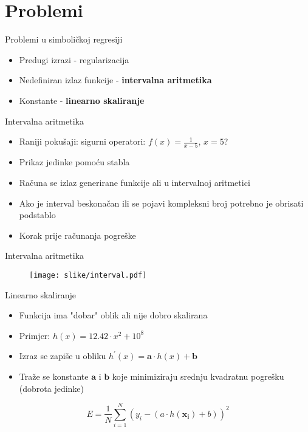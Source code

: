 \documentclass[utf8]{beamer}
\begin{document}
\section{Problemi}
\begin{frame}{Problemi u simboličkoj regresiji}
\begin{itemize}
\item Predugi izrazi - regularizacija
\item Nedefiniran izlaz funkcije - \textbf{intervalna aritmetika}
\item Konstante - \textbf{linearno skaliranje}
\end{itemize}
\end{frame}

\begin{frame}{Intervalna aritmetika}
	\begin{itemize}
		\item Raniji pokušaji: sigurni operatori: $f(x)=\frac{1}{x-5}$, $x=5$?
		\pause
		\item Prikaz jedinke pomoću stabla
		\item Računa se izlaz generirane funkcije ali u intervalnoj aritmetici
		\item Ako je interval beskonačan ili se pojavi kompleksni broj potrebno je obrisati podstablo
		\item Korak prije računanja pogreške
	\end{itemize}
\end{frame}

\begin{frame}{Intervalna aritmetika}
	\begin{figure}
		\centering
		\texttt{[image: slike/interval.pdf]}
	\end{figure}
\end{frame}

\begin{frame}{Linearno skaliranje}
	\begin{itemize}
		\item Funkcija ima "dobar" oblik ali nije dobro skalirana
		\item Primjer: $h(x) = 12.42\cdot x^{2} + 10^{8}$
		\pause
		\item Izraz se zapiše u obliku $h^{'}(x)=\mathbf{a}\cdot h(x) + \mathbf{b}$		
		\item Traže se konstante $\mathbf{a}$ i $\mathbf{b}$ koje minimiziraju srednju kvadratnu pogrešku (dobrota jedinke)
	\end{itemize}
\begin{equation}
E = \frac{1}{N}\sum_{i=1}^{N}(y_{i}-(a\cdot h(\mathbf{x_{i}})+b))^2
\end{equation}
\end{frame}
\end{document}
